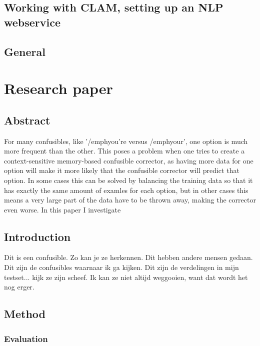 \documentclass[12pt]{article}
\let\stdsection\section
\renewcommand\section{\newpage\stdsection}
\begin{document}
\subsection{Working with CLAM, setting up an NLP webservice}

\subsection{General}


\section{Research paper}

\subsection*{Abstract}

For many confusibles, like '/emph{you're} versus /emph{your}', one option is much more frequent than the other. This poses a problem when one tries to create a context-sensitive memory-based confusible corrector, as having more data for one option will make it more likely that the confusible corrector will predict that option. In some cases this can be solved by balancing the training data so that it has exactly the same amount of examles for each option, but in other cases this means a very large part of the data have to be thrown away, making the corrector even worse. In this paper I investigate %

\subsection{Introduction}

Dit is een confusible. Zo kan je ze herkennen. Dit hebben andere mensen gedaan. Dit zijn de confusibles waarnaar ik ga kijken. Dit zijn de verdelingen in mijn testset... kijk ze zijn scheef. Ik kan ze niet altijd weggooien, want dat wordt het nog erger. 

\subsection{Method}


\subsubsection{Evaluation}
\end{document}

